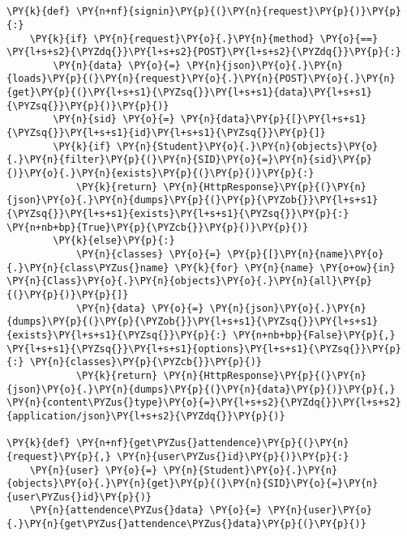 \section*{}

\begin{Verbatim}[commandchars=\\\{\}]
\PY{k}{def} \PY{n+nf}{signin}\PY{p}{(}\PY{n}{request}\PY{p}{)}\PY{p}{:}
    \PY{k}{if} \PY{n}{request}\PY{o}{.}\PY{n}{method} \PY{o}{==} \PY{l+s+s2}{\PYZdq{}}\PY{l+s+s2}{POST}\PY{l+s+s2}{\PYZdq{}}\PY{p}{:}
        \PY{n}{data} \PY{o}{=} \PY{n}{json}\PY{o}{.}\PY{n}{loads}\PY{p}{(}\PY{n}{request}\PY{o}{.}\PY{n}{POST}\PY{o}{.}\PY{n}{get}\PY{p}{(}\PY{l+s+s1}{\PYZsq{}}\PY{l+s+s1}{data}\PY{l+s+s1}{\PYZsq{}}\PY{p}{)}\PY{p}{)}
        \PY{n}{sid} \PY{o}{=} \PY{n}{data}\PY{p}{[}\PY{l+s+s1}{\PYZsq{}}\PY{l+s+s1}{id}\PY{l+s+s1}{\PYZsq{}}\PY{p}{]}
        \PY{k}{if} \PY{n}{Student}\PY{o}{.}\PY{n}{objects}\PY{o}{.}\PY{n}{filter}\PY{p}{(}\PY{n}{SID}\PY{o}{=}\PY{n}{sid}\PY{p}{)}\PY{o}{.}\PY{n}{exists}\PY{p}{(}\PY{p}{)}\PY{p}{:}
            \PY{k}{return} \PY{n}{HttpResponse}\PY{p}{(}\PY{n}{json}\PY{o}{.}\PY{n}{dumps}\PY{p}{(}\PY{p}{\PYZob{}}\PY{l+s+s1}{\PYZsq{}}\PY{l+s+s1}{exists}\PY{l+s+s1}{\PYZsq{}}\PY{p}{:} \PY{n+nb+bp}{True}\PY{p}{\PYZcb{}}\PY{p}{)}\PY{p}{)}
        \PY{k}{else}\PY{p}{:}
            \PY{n}{classes} \PY{o}{=} \PY{p}{[}\PY{n}{name}\PY{o}{.}\PY{n}{class\PYZus{}name} \PY{k}{for} \PY{n}{name} \PY{o+ow}{in} \PY{n}{Class}\PY{o}{.}\PY{n}{objects}\PY{o}{.}\PY{n}{all}\PY{p}{(}\PY{p}{)}\PY{p}{]}
            \PY{n}{data} \PY{o}{=} \PY{n}{json}\PY{o}{.}\PY{n}{dumps}\PY{p}{(}\PY{p}{\PYZob{}}\PY{l+s+s1}{\PYZsq{}}\PY{l+s+s1}{exists}\PY{l+s+s1}{\PYZsq{}}\PY{p}{:} \PY{n+nb+bp}{False}\PY{p}{,} \PY{l+s+s1}{\PYZsq{}}\PY{l+s+s1}{options}\PY{l+s+s1}{\PYZsq{}}\PY{p}{:} \PY{n}{classes}\PY{p}{\PYZcb{}}\PY{p}{)}
            \PY{k}{return} \PY{n}{HttpResponse}\PY{p}{(}\PY{n}{json}\PY{o}{.}\PY{n}{dumps}\PY{p}{(}\PY{n}{data}\PY{p}{)}\PY{p}{,} \PY{n}{content\PYZus{}type}\PY{o}{=}\PY{l+s+s2}{\PYZdq{}}\PY{l+s+s2}{application/json}\PY{l+s+s2}{\PYZdq{}}\PY{p}{)}

\PY{k}{def} \PY{n+nf}{get\PYZus{}attendence}\PY{p}{(}\PY{n}{request}\PY{p}{,} \PY{n}{user\PYZus{}id}\PY{p}{)}\PY{p}{:}
    \PY{n}{user} \PY{o}{=} \PY{n}{Student}\PY{o}{.}\PY{n}{objects}\PY{o}{.}\PY{n}{get}\PY{p}{(}\PY{n}{SID}\PY{o}{=}\PY{n}{user\PYZus{}id}\PY{p}{)}
    \PY{n}{attendence\PYZus{}data} \PY{o}{=} \PY{n}{user}\PY{o}{.}\PY{n}{get\PYZus{}attendence\PYZus{}data}\PY{p}{(}\PY{p}{)}


\end{Verbatim}
